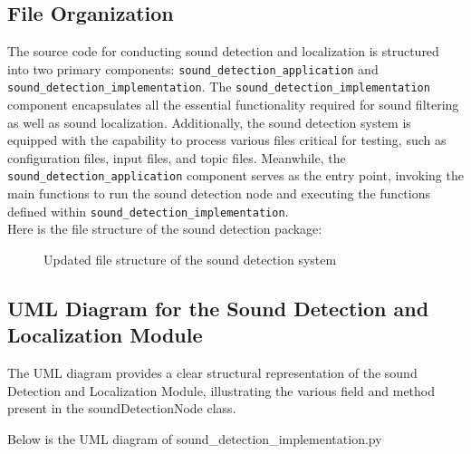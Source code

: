 \documentclass{CSSRforAfrica}
\begin{document}
\subsection*{File Organization}
The source code for conducting sound detection and localization is structured into two primary components: \texttt{sound\_detection\_application} and  \texttt{sound\_detection\_implementation}. The \texttt{sound\_detection\_implementation} component encapsulates all the essential functionality required for sound filtering as well as sound localization. Additionally, the sound detection system is equipped with the capability to process various files critical for testing, such as configuration files, input files, and topic files. Meanwhile, the \texttt{sound\_detection\_application} component serves as the entry point, invoking the main functions to run the sound detection node and executing the functions defined within \texttt{sound\_detection\_implementation}.\\

Here is the file structure of the sound detection package:

\begin{figure}[h]	
	\renewcommand*\DTstyle{\ttfamily}
	\caption{Updated file structure of the sound detection system}
	\label{fig:sound_detection_directory}
\end{figure}

\subsection*{UML Diagram for the Sound Detection and Localization Module}
The UML diagram provides a clear structural representation of the sound Detection and Localization Module, illustrating the various field and method present in the soundDetectionNode class.

\newpage

Below is the UML diagram of sound\_detection\_implementation.py
\end{document}
